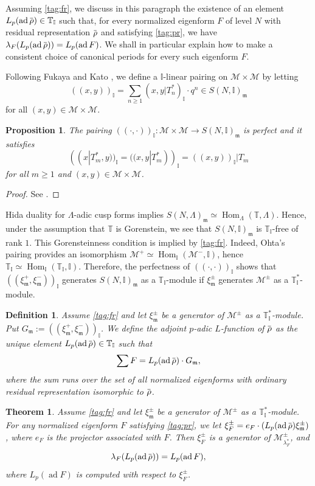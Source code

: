 \documentclass[12pt]{amsart}
\newcommand\bI{\mathbb{I}}
\newcommand\bT{\mathbb{T}}
\newcommand\cM{\mathcal{M}}
\newcommand\gm{\mathfrak{m}}
\newcommand{\ob}[1]{\mkern 1.5mu\overline{\mkern-1.5mu#1\mkern-1.5mu}\mkern 1.5mu}
\DeclareMathOperator{\Hom}{Hom}
\DeclareMathOperator{\ad}{ad}
\theoremstyle{defstyle}
\newtheorem{definition}[subsubsection]{Definition}
\theoremstyle{thmstyle}
\newtheorem{theorem}[subsubsection]{Theorem}
\newtheorem{proposition}[subsubsection]{Proposition}
\begin{document}
Assuming \eqref{tag:fr}, we discuss in this paragraph the existence of an element $L_p(\ad \ob{\rho})\in\bT_\bI$ such that, for every normalized eigenform $F$ of level $N$ with residual representation $\ob{\rho}$ and satisfying \eqref{tag:pr}, we have $\lambda_F(L_p(\ad \ob{\rho}))=L_p(\ad F)$. We shall in particular explain how to make a consistent choice of canonical periods for every such eigenform $F$.

Following Fukaya and Kato \cite[\S1.6]{fukayakato}, we define a $\bI$-linear pairing on $\cM \times \cM$ by letting
\[((x,y))_\bI=\sum_{n\geq 1} (x,y|T_n^*)_\bI \cdot q^n\in S(N,\bI)_\gm\]
for all $(x,y)\in\cM \times \cM$.
\begin{proposition}\label{prop:pairing_fukaya_kato}
	The pairing $((\cdot,\cdot))_\bI \colon \cM \times \cM \to S(N,\bI)_\gm$ is perfect and it satisfies
	\[((x|T_m^*,y))_\bI=((x,y|T_m^*))_\bI=((x,y))_\bI|T_m\]
	for all $m\geq1$ and $(x,y)\in\cM \times \cM$. 
\end{proposition}
\begin{proof}
	See \cite[Prop. 1.6.6]{fukayakato}.
\end{proof}
Hida duality for $\Lambda$-adic cusp forms \cite[Thm. 1.3]{hidaAIF} implies $S(N,\Lambda)_\gm\simeq \Hom_{\Lambda}(\bT,\Lambda)$. Hence, under the assumption that $\bT$ is Gorenstein, we see that $S(N,\bI)_\gm$ is $\bT_\bI$-free of rank $1$. This Gorensteinness condition is implied by \eqref{tag:fr}. Indeed, Ohta's pairing provides an isomorphism $\cM^+\simeq\Hom_\bI(\cM^-,\bI)$, hence $\bT_\bI\simeq\Hom_\bI(\bT_\bI,\bI)$. Therefore, the perfectness of $((\cdot,\cdot))_\bI$ shows that  $((\xi^+_\gm,\xi^-_\gm))_\bI$ generates $S(N,\bI)_\gm$ as a $\bT_\bI$-module if $\xi_\gm^\pm$ generates $\cM^\pm$ as a $\bT_\bI^*$-module.
\begin{definition}\label{def:formula_adjoint_rho_bar}
	Assume \eqref{tag:fr} and let $\xi_\gm^\pm$ be a generator of $\cM^\pm$ as a $\bT_\bI^*$-module. Put $G_\gm:=((\xi^+_\gm,\xi^-_\gm))_\bI$. We define the adjoint $p$-adic $L$-function of $\ob{\rho}$ as the unique element $L_p(\ad \ob{\rho})\in\bT_\bI$ such that
	\begin{equation}\label{eq:formula_adjoint_rho_bar}
		\sum F=L_p(\ad \ob{\rho})\cdot G_\gm,
	\end{equation}
	where the sum runs over the set of all normalized eigenforms with ordinary residual representation isomorphic to $\ob{\rho}$. 
\end{definition}
\begin{theorem}\label{thm:specialization_Hida_eigenforms}
	Assume \eqref{tag:fr} and let $\xi_\gm^\pm$ be a generator of $\cM^\pm$ as a $\bT_\bI^*$-module. For any normalized eigenform $F$ satisfying \eqref{tag:pr}, we let $\xi_F^\pm= e_F\cdot (L_p(\ad \ob{\rho})\xi^\pm_\gm)$, where $e_F$ is the projector associated with $F$. Then $\xi_F^\pm$ is a generator of $\cM^\pm_{\lambda^*_F}$, and 
	\[\lambda_F(L_p(\ad \ob{\rho}))=L_p(\ad F), \]
	where $L_p(\ad F)$ is computed with respect to $\xi^\pm_F$.
\end{theorem}
\end{document}
